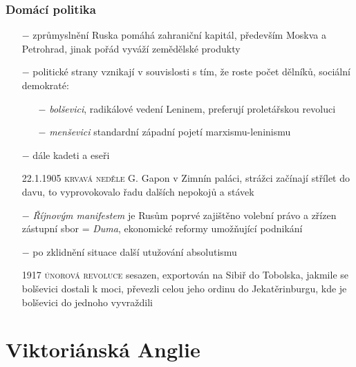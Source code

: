 \documentclass{article}
\begin{document}
\subsubsection*{Domácí politika}
\begin{itemize}
    \vspace{-0.5em}
    \setlength\itemsep{0.15em}
    \item[$-$] zprůmyslnění Ruska pomáhá zahraniční kapitál, především Moskva a Petrohrad, jinak pořád vyváží zemědělské produkty
    \item[$-$] politické strany vznikají v souvislosti s tím, že roste počet dělníků, sociální demokraté:
    \begin{itemize}
        \vspace{-0.5em}
        \setlength\itemsep{0.15em}
        \item[$-$] \textit{bolševici}, radikálové vedení Leninem, preferují proletářskou revoluci
        \item[$-$] \textit{menševici} standardní západní pojetí marxismu-leninismu
    \end{itemize}
    \item[$-$] dále kadeti a eseři
    \item[22.1.1905] \textsc{krvavá neděle} G. Gapon v Zimnín paláci, strážci začínají střílet do davu, to vyprovokovalo řadu dalších nepokojů a stávek
    \item[$-$] \textit{Říjnovým manifestem} je Rusům poprvé zajištěno volební právo a zřízen zástupní sbor = \textit{Duma}, ekonomické reformy umožňující podnikání
    \item[$-$] po zklidnění situace další utužování absolutismu
    \item[1917] \textsc{únorová revoluce} sesazen, exportován na Sibiř do Tobolska, jakmile se bolševici dostali k moci, převezli celou jeho ordinu do Jekatěrinburgu, kde je bolševici do jednoho vyvraždili
\end{itemize}

\section*{Viktoriánská Anglie}
\end{document}
